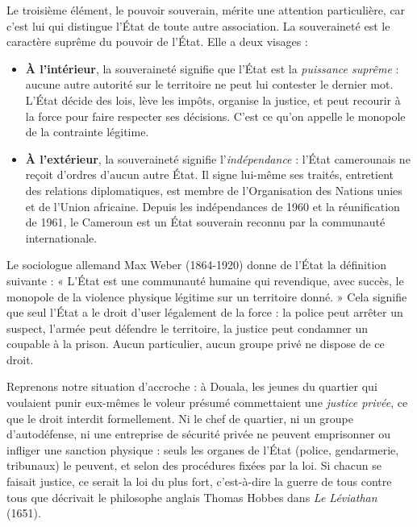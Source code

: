 \documentclass[11pt]{article}
\newcommand{\cle}[1]{{\popxbold\color{popdark}#1}}
\newcounter{popsec}
\newcounter{popsub}
\newcommand{\courssub}[1]{%
  \stepcounter{popsub}%
  \par\vspace{9pt}\noindent{\popxbold\fontsize{11.5}{13}\selectfont\color{popink}{\color{poporange}\thepopsec.\thepopsub}\hspace{6pt}#1}\par\nopagebreak\vspace{4pt}
}
\begin{document}
\courssub{La souveraineté : le cœur du pouvoir étatique}

Le troisième élément, le pouvoir souverain, mérite une attention particulière, car c'est lui qui distingue l'État de toute autre association. La \cle{souveraineté} est le caractère suprême du pouvoir de l'État. Elle a deux visages :

\begin{itemize}
\item \textbf{À l'intérieur}, la souveraineté signifie que l'État est la \emph{puissance suprême} : aucune autre autorité sur le territoire ne peut lui contester le dernier mot. L'État décide des lois, lève les impôts, organise la justice, et peut recourir à la force pour faire respecter ses décisions. C'est ce qu'on appelle le \cle{monopole de la contrainte légitime}.
\item \textbf{À l'extérieur}, la souveraineté signifie l'\emph{indépendance} : l'État camerounais ne reçoit d'ordres d'aucun autre État. Il signe lui-même ses traités, entretient des relations diplomatiques, est membre de l'Organisation des Nations unies et de l'Union africaine. Depuis les indépendances de 1960 et la réunification de 1961, le Cameroun est un État souverain reconnu par la communauté internationale.
\end{itemize}

\begin{definition}
Le sociologue allemand Max Weber (1864-1920) donne de l'État la définition suivante : « L'État est une communauté humaine qui revendique, avec succès, le \cle{monopole de la violence physique légitime} sur un territoire donné. » Cela signifie que seul l'État a le droit d'user légalement de la force : la police peut arrêter un suspect, l'armée peut défendre le territoire, la justice peut condamner un coupable à la prison. Aucun particulier, aucun groupe privé ne dispose de ce droit.
\end{definition}

Reprenons notre situation d'accroche : à Douala, les jeunes du quartier qui voulaient punir eux-mêmes le voleur présumé commettaient une \emph{justice privée}, ce que le droit interdit formellement. Ni le chef de quartier, ni un groupe d'autodéfense, ni une entreprise de sécurité privée ne peuvent emprisonner ou infliger une sanction physique : seuls les organes de l'État (police, gendarmerie, tribunaux) le peuvent, et selon des procédures fixées par la loi. Si chacun se faisait justice, ce serait la loi du plus fort, c'est-à-dire la guerre de tous contre tous que décrivait le philosophe anglais Thomas Hobbes dans \emph{Le Léviathan} (1651).
\end{document}
